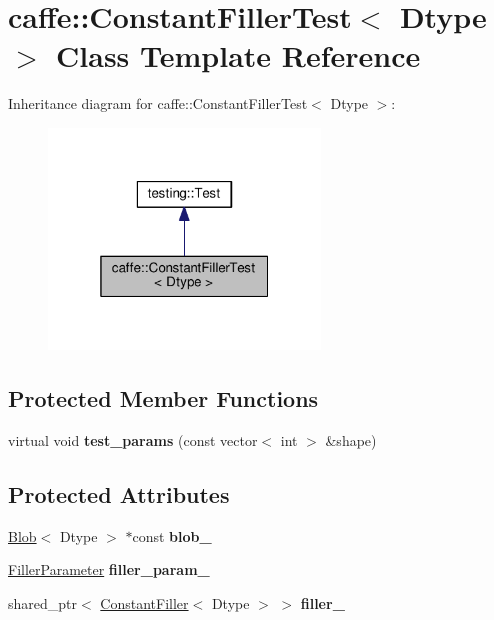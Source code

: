 \hypertarget{classcaffe_1_1_constant_filler_test}{}\section{caffe\+:\+:Constant\+Filler\+Test$<$ Dtype $>$ Class Template Reference}
\label{classcaffe_1_1_constant_filler_test}


Inheritance diagram for caffe\+:\+:Constant\+Filler\+Test$<$ Dtype $>$\+:
\nopagebreak
\begin{figure}[H]
\begin{center}
\leavevmode
\includegraphics[width=205pt]{classcaffe_1_1_constant_filler_test__inherit__graph}
\end{center}
\end{figure}
\subsection*{Protected Member Functions}
\begin{DoxyCompactItemize}
\item 
\mbox{\label{classcaffe_1_1_constant_filler_test_af9cf0cdc4e106fd51948d7a108fc9c69}} 
virtual void {\bfseries test\+\_\+params} (const vector$<$ int $>$ \&shape)
\end{DoxyCompactItemize}
\subsection*{Protected Attributes}
\begin{DoxyCompactItemize}
\item 
\mbox{\label{classcaffe_1_1_constant_filler_test_a3c61da8de712122294a6b0df36f9f6a7}} 
\mbox{\hyperlink{classcaffe_1_1_blob}{Blob}}$<$ Dtype $>$ $\ast$const {\bfseries blob\+\_\+}
\item 
\mbox{\label{classcaffe_1_1_constant_filler_test_ae7c14a37c8b6370fc539cd82fb90d972}} 
\mbox{\hyperlink{classcaffe_1_1_filler_parameter}{Filler\+Parameter}} {\bfseries filler\+\_\+param\+\_\+}
\item 
\mbox{\label{classcaffe_1_1_constant_filler_test_adc3aca9d62166a3d14202317bbb89a3d}} 
shared\+\_\+ptr$<$ \mbox{\hyperlink{classcaffe_1_1_constant_filler}{Constant\+Filler}}$<$ Dtype $>$ $>$ {\bfseries filler\+\_\+}
\end{DoxyCompactItemize}
